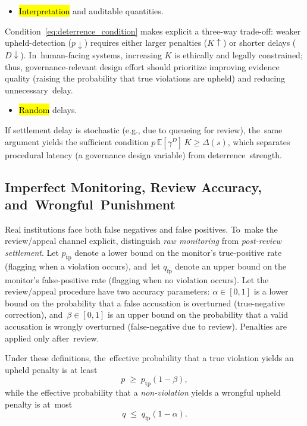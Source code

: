 \documentclass[mca,article,accept,pdftex,oneauthor]{Definitions/mdpi}
\begin{document}
\begin{itemize}[leftmargin=-0.5pt, label={}] %
\item {\hl{Interpretation} and auditable quantities.}
\end{itemize}

Condition~\eqref{eq:deterrence_condition} makes explicit a three-way trade-off: weaker upheld-detection ($p\downarrow$) requires either larger penalties ($K\uparrow$) or shorter delays ($D\downarrow$). In~human-facing systems, increasing $K$ is ethically and legally constrained; thus, governance-relevant design effort should prioritize improving evidence quality (raising the probability that true violations are upheld) and reducing unnecessary~delay.

\begin{itemize}[leftmargin=-0.5pt, label={}] %
\item {\hl{Random} delays.}
\end{itemize}

If settlement delay is stochastic (e.g., due to queueing for review), the~same argument yields the sufficient condition $p\,\mathbb{E}[\gamma^{D}]\,K \ge \Delta(s)$, which separates procedural latency (a governance design variable) from deterrence~strength.

\subsection{Imperfect Monitoring, Review Accuracy, and~Wrongful~Punishment}
\label{sec:falsepos}

Real institutions face both false negatives and false positives. To~make the review/appeal channel explicit, distinguish \emph{raw monitoring} from \emph{post-review settlement}. Let $p_{\mathrm{tp}}$ denote a lower bound on the monitor’s true-positive rate (flagging when a violation occurs), and~let $q_{\mathrm{fp}}$ denote an upper bound on the monitor’s false-positive rate (flagging when no violation occurs). Let the review/appeal procedure have two accuracy parameters: $\alpha\in[0,1]$ is a lower bound on the probability that a false accusation is overturned (true-negative correction), and~$\beta\in[0,1]$ is an upper bound on the probability that a valid accusation is wrongly overturned (false-negative due to review). Penalties are applied only after~review.

Under these definitions, the~effective probability that a true violation yields an upheld penalty is at least
\begin{equation}
\label{eq:peff}
p \;\ge\; p_{\mathrm{tp}}(1-\beta),
\end{equation}
while the effective probability that a \emph{non-violation} yields a wrongful upheld penalty is \mbox{at most}
\begin{equation}
\label{eq:qeff}
q \;\le\; q_{\mathrm{fp}}(1-\alpha).
\end{equation}
\end{document}
